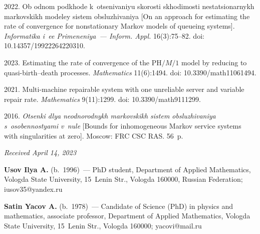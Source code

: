 \begin{multicols}{2}
{{\begin{thebibliography}{99}
 

 2022. Ob od\-nom pod\-kho\-de k~otse\-ni\-va\-niyu sko\-rosti skho\-di\-mosti ne\-sta\-tsi\-o\-nar\-nykh mar\-kov\-skikh mo\-de\-ley sis\-tem 
 ob\-slu\-zhi\-va\-niya [On an approach for estimating the rate of convergence for nonstationary Markov models of queueing systems]. 
 \textit{Informatika i~ee Primeneniya~--- Inform. Appl.} 16(3):75--82.  doi: 10.14357/19922264220310.


 2023. Estimating the rate of convergence of the $\mathrm{PH}/M/1$ model by reducing to quasi-birth--death processes. 
 \textit{Mathematics} 11(6):1494. doi: 10.3390/math11061494.

 2021. Multi-machine repairable system with one unreliable server and variable repair rate. 
\textit{Mathematics} 9(11):1299. doi: 10.3390/math9111299.


 2016. \textit{Otsen\-ki dlya ne\-od\-no\-rod\-nykh mar\-kov\-skikh sis\-tem ob\-slu\-zhi\-va\-niya s~oso\-ben\-no\-stya\-mi v~nu\-le} 
 [Bounds for inhomogeneous Markov service systems with singularities at zero]. Moscow: FRC CSC RAS. 56~p.
\end{thebibliography}

 }
 }

\end{multicols}

\vspace*{-6pt}

\hfill{\small\textit{Received April 14, 2023}} 

\vspace*{-12pt}


\Contr

\noindent
\textbf{Usov Ilya A.} (b.\ 1996)~--- PhD student, Department
of Applied Mathematics, Vologda State University, 15~Lenin Str., Vologda 160000, Russian Federation; 
\mbox{iusov35@yandex.ru}

\vspace*{3pt}

\noindent
\textbf{Satin Yacov A.} (b.\ 1978)~--- Candidate of Science (PhD) in physics and mathematics, associate professor, Department
of Applied Mathematics, Vologda State University, 15~Lenin Str., Vologda 160000; \mbox{yacovi@mail.ru}

